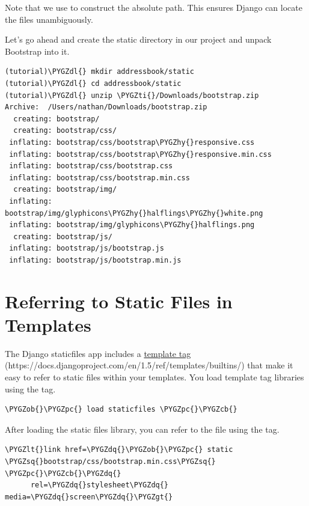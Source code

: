 \documentclass[letterpaper,10pt,english]{sphinxmanual}
\def\PYGZob{\char`\{}
\def\PYGZcb{\char`\}}
\def\PYGZlt{\char`\<}
\def\PYGZgt{\char`\>}
\def\PYGZpc{\char`\%}
\def\PYGZdl{\char`\$}
\def\PYGZhy{\char`\-}
\def\PYGZsq{\char`\'}
\def\PYGZdq{\char`\"}
\def\PYGZti{\char`\~}
\renewcommand\PYGZsq{\textquotesingle}
\begin{document}
Note that we use  to construct the absolute path. This
ensures Django can locate the files unambiguously.

Let's go ahead and create the static directory in our project and
unpack Bootstrap into it.

\begin{Verbatim}[commandchars=\\\{\}]
(tutorial)\PYGZdl{} mkdir addressbook/static
(tutorial)\PYGZdl{} cd addressbook/static
(tutorial)\PYGZdl{} unzip \PYGZti{}/Downloads/bootstrap.zip
Archive:  /Users/nathan/Downloads/bootstrap.zip
  creating: bootstrap/
  creating: bootstrap/css/
 inflating: bootstrap/css/bootstrap\PYGZhy{}responsive.css
 inflating: bootstrap/css/bootstrap\PYGZhy{}responsive.min.css
 inflating: bootstrap/css/bootstrap.css
 inflating: bootstrap/css/bootstrap.min.css
  creating: bootstrap/img/
 inflating: bootstrap/img/glyphicons\PYGZhy{}halflings\PYGZhy{}white.png
 inflating: bootstrap/img/glyphicons\PYGZhy{}halflings.png
  creating: bootstrap/js/
 inflating: bootstrap/js/bootstrap.js
 inflating: bootstrap/js/bootstrap.min.js
\end{Verbatim}


\section{Referring to Static Files in Templates}
\label{tutorial/static:referring-to-static-files-in-templates}
The Django staticfiles app includes a \href{https://docs.djangoproject.com/en/1.5/ref/templates/builtins/}{template tag} (https://docs.djangoproject.com/en/1.5/ref/templates/builtins/) that make it
easy to refer to static files within your templates. You load template
tag libraries using the  tag.

\begin{Verbatim}[commandchars=\\\{\}]
\PYGZob{}\PYGZpc{} load staticfiles \PYGZpc{}\PYGZcb{}
\end{Verbatim}

After loading the static files library, you can refer to the file
using the  tag.

\begin{Verbatim}[commandchars=\\\{\}]
\PYGZlt{}link href=\PYGZdq{}\PYGZob{}\PYGZpc{} static \PYGZsq{}bootstrap/css/bootstrap.min.css\PYGZsq{} \PYGZpc{}\PYGZcb{}\PYGZdq{}
      rel=\PYGZdq{}stylesheet\PYGZdq{} media=\PYGZdq{}screen\PYGZdq{}\PYGZgt{}
\end{Verbatim}
\end{document}
